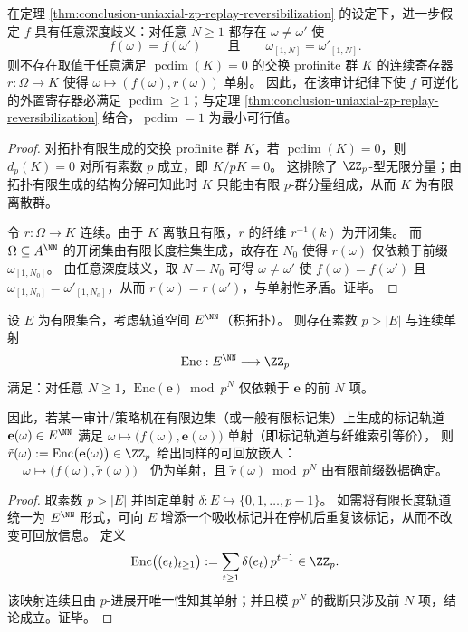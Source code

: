 \begin{proposition}[任意深度歧义排除有限寄存器：\texorpdfstring{$\operatorname{pcdim}\ge 1$}{pcdim>=1} 的必要性]\label{prop:conclusion-pcdim-lowerbound-deep-ambiguity}
在定理 \ref{thm:conclusion-uniaxial-zp-replay-reversibilization} 的设定下，进一步假定 \(f\) 具有任意深度歧义：对任意 \(N\ge 1\) 都存在 \(\omega\neq \omega'\) 使
\[
f(\omega)=f(\omega')\qquad\text{且}\qquad \omega_{[1,N]}=\omega'_{[1,N]}.
\]
则不存在取值于任意满足 \(\operatorname{pcdim}(K)=0\) 的交换 profinite 群 \(K\) 的连续寄存器 \(r:\Omega\to K\) 使得 \(\omega\mapsto (f(\omega),r(\omega))\) 单射。
因此，在该审计纪律下使 \(f\) 可逆化的外置寄存器必满足 \(\operatorname{pcdim}\ge 1\)；与定理 \ref{thm:conclusion-uniaxial-zp-replay-reversibilization} 结合，\(\operatorname{pcdim}=1\) 为最小可行值。
\end{proposition}
\begin{proof}
对拓扑有限生成的交换 profinite 群 \(K\)，若 \(\operatorname{pcdim}(K)=0\)，则 \(d_p(K)=0\) 对所有素数 \(p\) 成立，即 \(K/pK=0\)。
这排除了 \(\ZZ_p\)-型无限分量；由拓扑有限生成的结构分解可知此时 \(K\) 只能由有限 \(p\)-群分量组成，从而 \(K\) 为有限离散群。
\par
令 \(r:\Omega\to K\) 连续。由于 \(K\) 离散且有限，\(r\) 的纤维 \(r^{-1}(k)\) 为开闭集。
而 \(\Omega\subseteq A^{\NN}\) 的开闭集由有限长度柱集生成，故存在 \(N_0\) 使得 \(r(\omega)\) 仅依赖于前缀 \(\omega_{[1,N_0]}\)。
由任意深度歧义，取 \(N=N_0\) 可得 \(\omega\neq\omega'\) 使 \(f(\omega)=f(\omega')\) 且 \(\omega_{[1,N_0]}=\omega'_{[1,N_0]}\)，从而 \(r(\omega)=r(\omega')\)，与单射性矛盾。证毕。
\end{proof}

\begin{proposition}\label{prop:conclusion-uniaxial-padic-trace-encoding}
设 \(E\) 为有限集合，考虑轨道空间 \(E^{\NN}\)（积拓扑）。
则存在素数 \(p>|E|\) 与连续单射
\[
\mathrm{Enc}:E^{\NN}\longrightarrow \ZZ_p
\]
满足：对任意 \(N\ge 1\)，\(\mathrm{Enc}(\mathbf e)\bmod p^N\) 仅依赖于 \(\mathbf e\) 的前 \(N\) 项。
\par
因此，若某一审计/策略机在有限边集（或一般有限标记集）上生成的标记轨道 \(\mathbf e(\omega)\in E^{\NN}\) 满足
\(\omega\mapsto\bigl(f(\omega),\mathbf e(\omega)\bigr)\) 单射（即标记轨道与纤维索引等价），
则 \(\tilde r(\omega):=\mathrm{Enc}\bigl(\mathbf e(\omega)\bigr)\in\ZZ_p\) 给出同样的可回放嵌入：
\[
\omega\longmapsto \bigl(f(\omega),\tilde r(\omega)\bigr)
\quad\text{仍为单射，且 }\tilde r(\omega)\bmod p^N\text{ 由有限前缀数据确定。}
\]
\end{proposition}
\begin{proof}
取素数 \(p>|E|\) 并固定单射 \(\delta:E\hookrightarrow\{0,1,\dots,p-1\}\)。
如需将有限长度轨道统一为 \(E^{\NN}\) 形式，可向 \(E\) 增添一个吸收标记并在停机后重复该标记，从而不改变可回放信息。
定义
\[
\mathrm{Enc}\bigl((e_t)_{t\ge 1}\bigr):=\sum_{t\ge 1}\delta(e_t)\,p^{t-1}\in\ZZ_p.
\]
该映射连续且由 \(p\)-进展开唯一性知其单射；并且模 \(p^N\) 的截断只涉及前 \(N\) 项，结论成立。证毕。
\end{proof}


